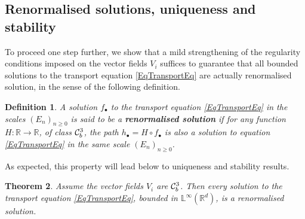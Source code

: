 \documentclass[11pt,a4paper]{amsart}
\newcommand{\RR}{\mathbb{R}}  \newcommand{\CC}{\mathbb{C}}  \newcommand{\LL}{\mathbb{L}}  \newcommand{\WW}{\mathbb{W}}
\renewcommand{\geq}{\geqslant}
\newtheorem{thm}{\hspace{-0.15cm}  {\sc Theorem} } %
\newtheorem{defn}[thm]{ \hspace{-0.3cm} {\sc Definition}}%
\numberwithin{equation}{section} %
\begin{document}
\subsection{Renormalised solutions, uniqueness and stability}
\label{SubsectionrenormalisedSolutions}

To proceed one step further, we show that a mild strengthening of the regularity conditions imposed on the vector fields $V_i$ suffices to guarantee that all bounded solutions to the transport equation \eqref{EqTransportEq} are actually renormalised solution, in the sense of the following definition. 

\begin{defn}
\label{DefnrenormalisedSolutions}
A solution $f_\bullet$ to the transport equation \eqref{EqTransportEq} in the scales $(E_n)_{n\geq 0}$ is said to be a \emph{\bf renormalised solution} if for any function $H : \RR\rightarrow\RR$, of class $\mathcal{C}^3_b$, the path $h_\bullet = H\circ f_\bullet$ is also a solution to equation \eqref{EqTransportEq} in the same scale $(E_n)_{n\geq 0}$.
\end{defn}

As expected, this property will lead below to uniqueness and stability results.

\begin{thm}
\label{ThmRenomalizedSolutions}
Assume the vector fields $V_i$ are $\mathcal{C}^3_b$. Then every solution to the transport equation \eqref{EqTransportEq}, bounded in $ \LL^\infty(\RR^d)$, is a renormalised solution.
\end{thm}
 
\medskip
 
\end{document}
